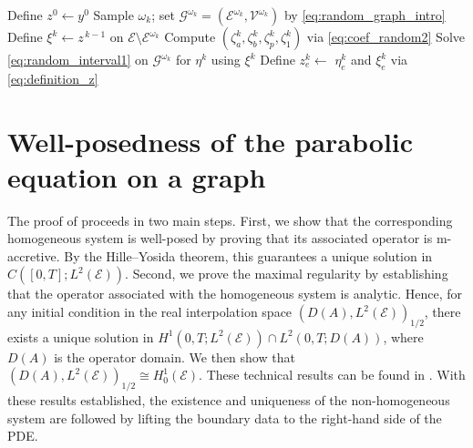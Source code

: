\documentclass[a4paper, 10pt, english]{article}
\begin{document}
\begin{algorithm}[h!]
  \caption{Subgraph Decomposition Scheme}\label{alg1}
  \begin{algorithmic}[1]
    \State Define $z^{0}\gets y^{0}$
      \State Sample $\omega_{k}$; set $\mathcal{G}^{\omega_k}=(\mathcal{E}^{\omega_k},\mathcal{V}^{\omega_k})$ by \eqref{eq:random_graph_intro}
      \State Define $\xi^{k}\gets z^{\,k-1}$ on $\mathcal{E}\setminus\mathcal{E}^{\omega_k}$
      \State Compute $(\zeta_a^k,\zeta_b^k,\zeta_p^k,\zeta_1^k)$ via \eqref{eq:coef_random2}
      \State Solve \eqref{eq:random_interval1} on $\mathcal{G}^{\omega_k}$ for $\eta^{k}$ using $\xi^{k}$
      \State Define $z^{k}_{e}\gets$  
        $\eta^{k}_{e}$ and $\xi^{k}_{e}$ via \eqref{eq:definition_z}
    \EndFor
  \end{algorithmic}
\end{algorithm}


\section{Well-posedness of the parabolic equation on a graph}\label{sec:well-posedness} The proof of  proceeds in two main steps. First, we show that the corresponding homogeneous system is well-posed by proving that its associated operator is m-accretive. By the Hille--Yosida theorem, this guarantees a unique solution in $C([0,T];L^2(\mathcal{E}))$. Second, we prove the maximal regularity by establishing that the operator associated with the homogeneous system is analytic. Hence, for any initial condition in the real interpolation space $(D(A),L^2(\mathcal{E}))_{1/2}$, there exists a unique solution in $H^1(0,T; L^2(\mathcal{E}))\cap L^2(0,T;D(A))$, where $D(A)$ is the operator domain. We then show that $(D(A),L^2(\mathcal{E}))_{1/2}\cong H_0^1(\mathcal{E})$. These technical results can be found in . With these results established, the existence and uniqueness of the non-homogeneous system are followed by lifting the boundary data to the right-hand side of the PDE.
\end{document}
